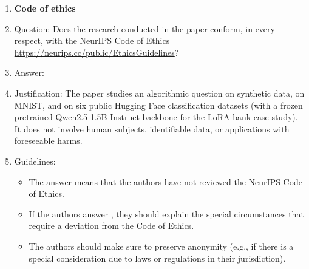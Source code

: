 \begin{enumerate}
\item {\bf Code of ethics}
    \item[] Question: Does the research conducted in the paper conform, in every respect, with the NeurIPS Code of Ethics \url{https://neurips.cc/public/EthicsGuidelines}?
    \item[] Answer: \answerYes{}
    \item[] Justification: The paper studies an algorithmic question on synthetic data, on MNIST, and on six public Hugging Face classification datasets (with a frozen pretrained Qwen2.5-1.5B-Instruct backbone for the LoRA-bank case study). It does not involve human subjects, identifiable data, or applications with foreseeable harms.
    \item[] Guidelines:
    \begin{itemize}
        \item The answer \answerNA{} means that the authors have not reviewed the NeurIPS Code of Ethics.
        \item If the authors answer \answerNo, they should explain the special circumstances that require a deviation from the Code of Ethics.
        \item The authors should make sure to preserve anonymity (e.g., if there is a special consideration due to laws or regulations in their jurisdiction).
    \end{itemize}



\end{enumerate}
